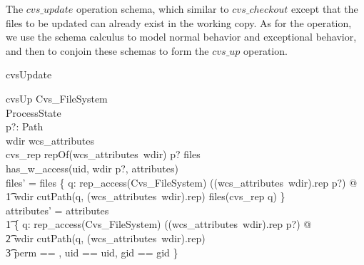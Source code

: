 The $cvs\_update$ operation schema, which similar to $cvs\_checkout$ except that 
the files to be updated can already exist
in the working copy.  As for the  operation, we use
the schema calculus to model
normal behavior and exceptional behavior, and then to conjoin these schemas to
form the $cvs\_up$ operation.
\enlargethispage{2.7\baselineskip}
\begin{doc}{cvsUpdate}
  \begin{schema}{cvsUp}
    \Delta Cvs\_FileSystem\\
    \Xi ProcessState \\
    p?: Path \\
    \where
    wdir \in \dom wcs\_attributes \\
    cvs\_rep \cat repOf(wcs\_attributes~wdir) \cat p? \in \dom files \\
    has\_w\_access(uid, wdir \cat p?, attributes) \\
    
    files' = files \oplus \{ q: rep\_access(\theta Cvs\_FileSystem)
    ((wcs\_attributes~wdir).rep \cat p?) @ \\ 
    \t1 wdir \cat cutPath(q, (wcs\_attributes~wdir).rep) \mapsto files(cvs\_rep
    \cat q) \} \\ 
    
    attributes' = attributes \oplus \\
    \t1 \{ q: rep\_access(\theta Cvs\_FileSystem) ((wcs\_attributes~wdir).rep
    \cat p?) @ \\
    \t2 wdir \cat cutPath(q, (wcs\_attributes~wdir).rep) \\
    \t3 \mapsto \lblot perm == \emptyset, uid == uid, gid == gid \rblot \} \\ 
    

\end{schema}
\end{doc}
